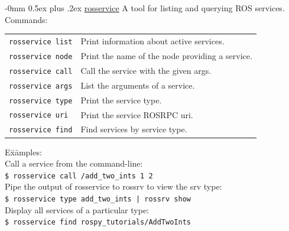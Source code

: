 \documentclass[10pt,landscape]{article}
\makeatletter
\renewcommand{\subsection}{\@startsection{subsection}{2}{0mm}%
                                {-0mm}%
                                {0.5ex plus .2ex}%
                                {\normalfont\normalsize\bfseries}}
\makeatother
\begin{document}
\begin{multicols}{3}
\subsection{\href{http://wiki.ros.org/rosservice}{rosservice}}
A tool for listing and querying ROS services.\\
\vspace{2.5 mm}
Commands: \\ 
\begin{tabular}{@{}p{\the\MyLen}%
                @{}p{\linewidth-\the\MyLen}@{}}
\texttt{rosservice list}  & Print information about active services. \\
\texttt{rosservice node}  & Print the name of the node providing a service. \\
\texttt{rosservice call}  & Call the service with the given args. \\
\texttt{rosservice args}  & List the arguments of a service. \\
\texttt{rosservice type}  & Print the service type. \\
\texttt{rosservice uri}   & Print the service ROSRPC uri. \\
\texttt{rosservice find}  & Find services by service type. 
\end{tabular}
\vspace{-2.5 mm}
\begin{tabbing}
E\=x\=amples:\\
\> Call a service from the command-line:\\
\> \>\texttt{\$ rosservice call /add\_two\_ints 1 2}\\
\> Pipe the output of rosservice to rossrv to view the srv type:\\
\> \>\texttt{\$ rosservice type add\_two\_ints | rossrv show}\\
\> Display all services of a particular type:\\
\> \>\texttt{\$ rosservice find rospy\_tutorials/AddTwoInts}\\
\end{tabbing}

\vspace{-1.5 mm}

\end{multicols}
\end{document}

